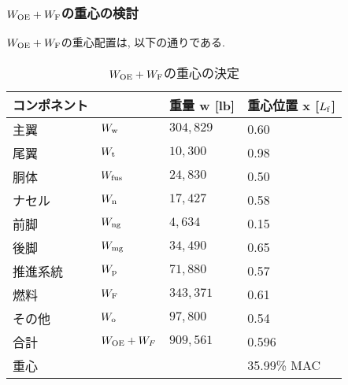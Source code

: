\documentclass[12pt]{jsarticle}
\begin{document}
\subsubsection{$W_{\rm OE} + W_{\rm F}$の重心の検討}
$W_{\rm OE} + W_{\rm F}$の重心配置は, 以下の通りである.
\begin{table}[H]
	\caption{$W_{\rm OE} + W_{\rm F}$の重心の決定}
	\begin{center}
		\begin{tabular}{p{2cm} p{2cm} p{3cm} p{3cm}} \hline
			コンポネント  & & 重量 w [lb] & 重心位置 x [$L_{\rm f}$] \\ \hline \hline
			主翼 & $W_{\rm w}$ & $304,829$ & 0.60 \\
			尾翼 & $W_{\rm t}$ & $10,300$ & 0.98 \\
			胴体 & $W_{\rm fus}$ & $24,830$ & 0.50 \\
			ナセル & $W_{\rm n}$ & $17,427$ & 0.58 \\
			前脚 & $W_{\rm ng}$ & $4,634$ & 0.15 \\
			後脚 & $W_{\rm mg}$ & $34,490$ & 0.65 \\
			推進系統 & $W_{\rm p}$ & $71,880$ & 0.57 \\
			燃料 & $W_{\rm F}$ & $343,371$ & 0.61 \\
			その他 & $W_{\rm o}$ & $97,800$ & 0.54 \\ \hline
			合計 & $W_{\rm OE} + W_{F}$ & $909,561$ & 0.596 \\ \hline \hline
			重心 & & & 35.99\% MAC \\ \hline
		\end{tabular}
	\end{center}
\end{table}
\end{document}
